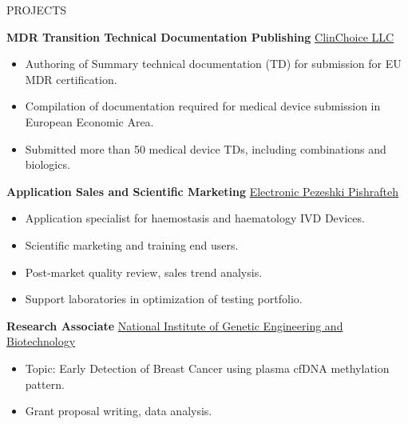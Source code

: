 \documentclass{resume}
\begin{document}
\begin{rSection}{PROJECTS}
\vspace{-1.25em}
\item \textbf{MDR Transition Technical Documentation Publishing} \hfill \href{https://clinchoice.com/solutions/medical-device-regulatory-affairs/technical-document-submission-approval-preparation/}{ClinChoice LLC}
\begin{itemize}
    \itemsep -3pt {} 
     \item Authoring of Summary technical documentation (TD) for submission for EU MDR certification.
     \item Compilation of documentation required for medical device submission in European Economic Area.
     \item Submitted more than 50 medical device TDs, including combinations and biologics.
 \end{itemize}

\item \textbf{Application Sales and Scientific Marketing} \hfill {\href{https://www.sysmex-europe.com/products/diagnostics/haemostasis.html}{Electronic Pezeshki Pishrafteh}}
\begin{itemize}
    \itemsep -3pt {} 
     \item Application specialist for haemostasis and haematology IVD Devices.
     \item Scientific marketing and training end users.
     \item Post-market quality review, sales trend analysis.
     \item Support laboratories in optimization of testing portfolio.
 \end{itemize}
\item \textbf{Research Associate} \hfill \href{http://www.nigeb.ac.ir/web/en}{National Institute of Genetic Engineering and Biotechnology}
\begin{itemize}
    \itemsep -3pt {} 
     \item Topic: Early Detection of Breast Cancer using plasma cfDNA methylation pattern.
     \item Grant proposal writing, data analysis.
 \end{itemize}
\end{rSection} 


\end{document}
